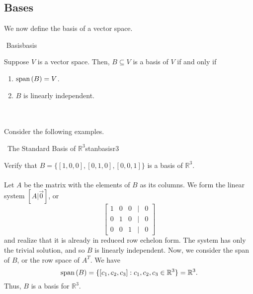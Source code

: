         \pagebreak

        \subsection{Bases}

            We now define the basis of a vector space.
            \begin{definition}{\Stop\,\,Basis}{basis}

                Suppose \(V\) is a vector space. Then, \(B\subseteq V\) is a basis of \(V\) if and only if
                \begin{enumerate}
                    \item \(\text{span\,}(B)=V\).
                    \item \(B\) is linearly independent.
                \end{enumerate}

            \end{definition}
            \vphantom
            \\
            \\
            Consider the following examples.
            \begin{example}{\Difficulty\,\Difficulty\,\,The Standard Basis of \(\mathbb{R}^3\)}{stanbasisr3}

                Verify that \(B=\{[1,0,0],[0,1,0],[0,0,1]\}\) is a basis of \(\mathbb{R}^3\).
                \\
                \\
                Let \(A\) be the matrix with the elements of \(B\) as its columns. We form the linear system \([A|\vec{0}]\), or
                \begin{equation*}
                    \begin{bmatrix}
                        1 & 0 & 0 & | & 0 \\
                        0 & 1 & 0 & | & 0 \\
                        0 & 0 & 1 & | & 0
                    \end{bmatrix}
                \end{equation*}
                and realize that it is already in reduced row echelon form. The system has only the trivial solution, and so \(B\) is linearly independent. Now, we consider the span of \(B\), or the row space of \(A^T\). We have
                \begin{equation*}
                    \text{span\,}(B)=\{[c_1,c_2,c_3]:c_1,c_2,c_3\in\mathbb{R}^3\}=\mathbb{R}^3.
                \end{equation*}
                Thus, \(B\) is a basis for \(\mathbb{R}^3\).
                
            \end{example}
